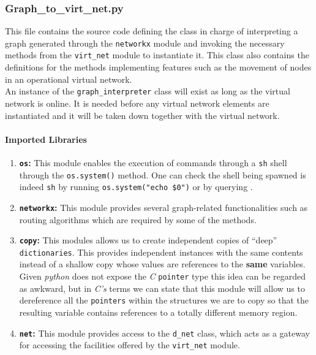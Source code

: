 \subsubsection{Graph\_to\_virt\_net.py}
   This file contains the source code defining the class in charge of interpreting a graph generated through the \texttt{networkx} module and invoking the necessary methods from the \texttt{virt\_net} module to instantiate it. This class also contains the definitions for the methods implementing features such as the movement of nodes in an operational virtual network.\\

   An instance of the \texttt{graph\_interpreter} class will exist as long as the virtual network is online. It is needed before any virtual network elements are instantiated and it will be taken down together with the virtual network.\\

   \paragraph{Imported Libraries}
        \begin{enumerate}
            \item \textbf{\texttt{os}:} This module enables the execution of commands through a \texttt{sh} shell through the \texttt{os.system()} method. One can check the shell being spawned is indeed \texttt{sh} by running \texttt{\allowbreak os.system("echo \$0")} or by querying \cite{bib:man-system}.
            \item \textbf{\texttt{networkx}:} This module provides several graph-related functionalities such as routing algorithms which are required by some of the methods.
            \item \textbf{\texttt{copy}:} This modules allows us to create independent copies of ``deep'' \texttt{dictionaries}. This provides independent instances with the same contents instead of a shallow copy whose values are references to the \textbf{same} variables. Given \textit{python} does not expose the \textit{C} \texttt{pointer} type this idea can be regarded as awkward, but in \textit{C's} terms we can state that this module will allow us to dereference all the \texttt{pointers} within the structures we are to copy so that the resulting variable contains references to a totally different memory region.
            \item \textbf{\texttt{net}:} This module provides access to the \texttt{d\_net} class, which acts as a gateway for accessing the facilities offered by the \texttt{virt\_net} module.
        \end{enumerate}

